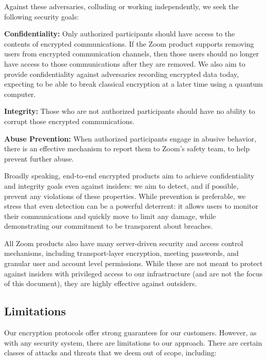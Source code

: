 Against these adversaries, colluding or working independently, we seek the following security goals:

\begin{description}
	\item {\bf Confidentiality:} Only authorized participants should have access to the contents of
	encrypted communications. If the Zoom product supports removing users from encrypted
	communication channels, then those users should no longer have access to those communications
	after they are removed. We also aim to provide confidentiality against adversaries recording
	encrypted data today, expecting to be able to break classical encryption at a later time using a
	quantum computer. 	
	\item {\bf Integrity:} Those who are not authorized participants should have no ability to
	corrupt those encrypted communications.
	\item {\bf Abuse Prevention:} When authorized participants engage in abusive behavior, there is
	an effective mechanism to report them to Zoom's safety team, to help prevent further abuse.
\end{description}

Broadly speaking, end-to-end encrypted products aim to achieve confidentiality and integrity goals
even against insiders: we aim to detect, and if possible, prevent any violations of these
properties. While prevention is preferable, we stress that even detection can be a powerful
deterrent: it allows users to monitor their communications and quickly move to limit any damage,
while demonstrating our commitment to be transparent about breaches.

All Zoom products also have many server-driven security and access control mechanisms, including
transport-layer encryption, meeting passwords, and granular user and account level permissions.
While these are not meant to protect against insiders with privileged access to our infrastructure
(and are not the focus of this document), they are highly effective against outsiders.

\subsection{Limitations}
\label{subsec:overall-limit}

Our encryption protocols offer strong guarantees for our customers. However, as with any security
system, there are limitations to our approach. There are certain classes of attacks and threats that
we deem out of scope, including:


